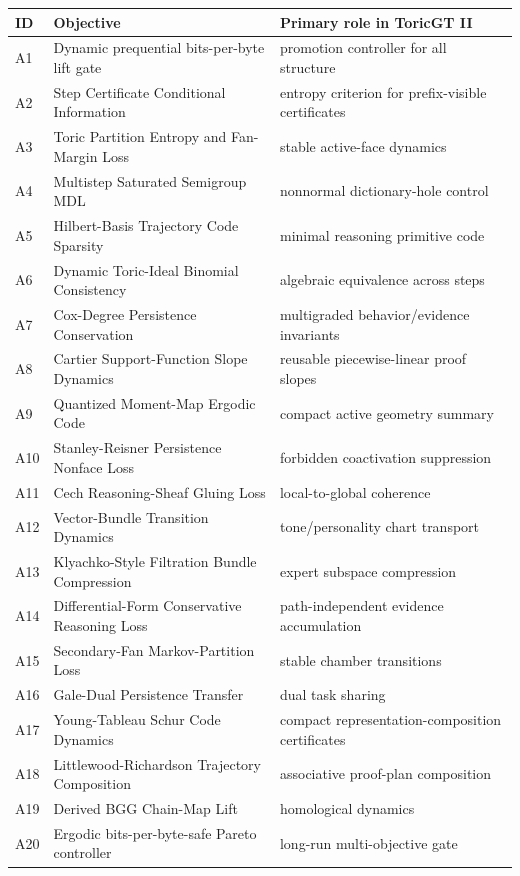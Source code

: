 \documentclass[10pt]{article}
\numberwithin{equation}{section}
\begin{document}
\begin{longtable}{p{}p{}p{}}
\toprule
ID & Objective & Primary role in ToricGT II\\
\midrule
\endhead
A1 & Dynamic prequential bits-per-byte lift gate & promotion controller for all structure\\
A2 & Step Certificate Conditional Information & entropy criterion for prefix-visible certificates\\
A3 & Toric Partition Entropy and Fan-Margin Loss & stable active-face dynamics\\
A4 & Multistep Saturated Semigroup MDL & nonnormal dictionary-hole control\\
A5 & Hilbert-Basis Trajectory Code Sparsity & minimal reasoning primitive code\\
A6 & Dynamic Toric-Ideal Binomial Consistency & algebraic equivalence across steps\\
A7 & Cox-Degree Persistence Conservation & multigraded behavior/evidence invariants\\
A8 & Cartier Support-Function Slope Dynamics & reusable piecewise-linear proof slopes\\
A9 & Quantized Moment-Map Ergodic Code & compact active geometry summary\\
A10 & Stanley-Reisner Persistence Nonface Loss & forbidden coactivation suppression\\
A11 & Cech Reasoning-Sheaf Gluing Loss & local-to-global coherence\\
A12 & Vector-Bundle Transition Dynamics & tone/personality chart transport\\
A13 & Klyachko-Style Filtration Bundle Compression & expert subspace compression\\
A14 & Differential-Form Conservative Reasoning Loss & path-independent evidence accumulation\\
A15 & Secondary-Fan Markov-Partition Loss & stable chamber transitions\\
A16 & Gale-Dual Persistence Transfer & dual task sharing\\
A17 & Young-Tableau Schur Code Dynamics & compact representation-composition certificates\\
A18 & Littlewood-Richardson Trajectory Composition & associative proof-plan composition\\
A19 & Derived BGG Chain-Map Lift & homological dynamics\\
A20 & Ergodic bits-per-byte-safe Pareto controller & long-run multi-objective gate\\

\end{longtable}
\end{document}
